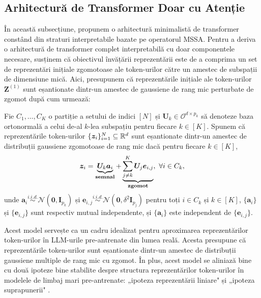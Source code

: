 \documentclass[../../book-main_ro.tex]{subfiles}
\begin{document}
\subsection{Arhitectură de Transformer Doar cu Atenție} \label{sub:aot}

În această subsecțiune, propunem o arhitectură minimalistă de transformer constând din straturi interpretabile bazate pe operatorul MSSA. Pentru a deriva o arhitectură de transformer complet interpretabilă cu doar componentele necesare,
susținem că obiectivul învățării reprezentării este de a comprima un set de reprezentări inițiale zgomotoase ale token-urilor către un amestec de subspații de dimensiune mică. %
Aici, presupunem că reprezentările inițiale ale token-urilor $\bm Z^{(1)}$ sunt eșantionate dintr-un amestec de gaussiene de rang mic perturbate de zgomot după cum urmează:
\begin{definition}\label{def:MoG}
Fie $C_1,\dots,C_K$ o partiție a setului de indici $[N]$ și $\bm U_k \in \mathcal{O}^{d \times p_k}$ să denoteze baza ortonormală a celui de-al $k$-lea subspațiu pentru fiecare $k \in [K]$. Spunem că reprezentările token-urilor $\{\bm z_i \}_{i=1}^N \subseteq \mathbb{R}^d$ sunt eșantionate dintr-un amestec de distribuții gaussiene zgomotoase de rang mic dacă pentru fiecare $k \in [K]$,
\begin{align}\label{eq:MoG}
    \bm z_i = \underbrace{\bm U_{k} \bm a_i}_{\bf semnal} + \underbrace{\sum_{j \neq k}^K \bm U_j \bm e_{i,j}}_{\bf zgomot},\ \forall i \in C_k, 
\end{align}
unde $\bm{a}_i \overset{i.i.d.}{\sim} \mathcal{N}(\bm{0},\bm{I}_{p_k})$ și $\bm{e}_{i,j} \overset{i.i.d.}{\sim} \mathcal{N}(\bm{0},\delta^2\bm{I}_{p_j})$ pentru toți $i \in C_k$ și $k \in [K]$, $\{\bm{a}_i\}$ și $\{\bm{e}_{i,j}\}$ sunt respectiv mutual independente, și $\{\bm{a}_i\}$ este independent de $\{\bm{e}_{i,j}\}$.
\end{definition}
Acest model servește ca un cadru idealizat pentru aproximarea reprezentărilor token-urilor în LLM-urile pre-antrenate din lumea reală. Acesta presupune că reprezentările token-urilor sunt eșantionate dintr-un amestec de distribuții gaussiene multiple de rang mic cu zgomot. În plus, acest model se aliniază bine cu două ipoteze bine stabilite despre structura reprezentărilor token-urilor în modelele de limbaj mari pre-antrenate: „ipoteza reprezentării liniare" \citep{jiang2024origins,park2023linear} și „ipoteza suprapunerii" \citep{elhage2022toy,yun2021transformer}.
\end{document}
